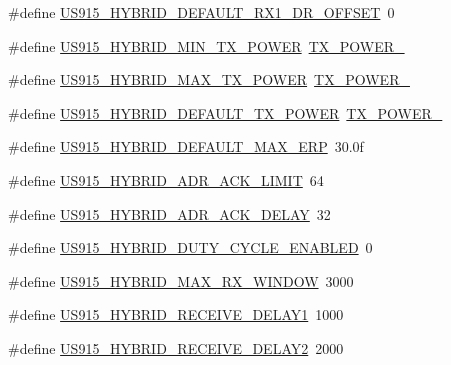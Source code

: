 \begin{DoxyCompactItemize}
\item 
\#define \hyperlink{group__REGIONUS915HYB_ga314e35b76742b3b9ba602e5e2bbcba3f}{U\+S915\+\_\+\+H\+Y\+B\+R\+I\+D\+\_\+\+D\+E\+F\+A\+U\+L\+T\+\_\+\+R\+X1\+\_\+\+D\+R\+\_\+\+O\+F\+F\+S\+ET}~0
\item 
\#define \hyperlink{group__REGIONUS915HYB_ga0aece8c836bf5bf19a28589cb3cda70e}{U\+S915\+\_\+\+H\+Y\+B\+R\+I\+D\+\_\+\+M\+I\+N\+\_\+\+T\+X\+\_\+\+P\+O\+W\+ER}~\hyperlink{group__REGION_gac9747c69350f34d485c3134e5a57655b}{T\+X\+\_\+\+P\+O\+W\+E\+R\+\_}
\item 
\#define \hyperlink{group__REGIONUS915HYB_ga94a1ed1e5cca1f05f0ac4916e164f529}{U\+S915\+\_\+\+H\+Y\+B\+R\+I\+D\+\_\+\+M\+A\+X\+\_\+\+T\+X\+\_\+\+P\+O\+W\+ER}~\hyperlink{group__REGION_gab33618449f2a573142c463ab071ef8ed}{T\+X\+\_\+\+P\+O\+W\+E\+R\+\_}
\item 
\#define \hyperlink{group__REGIONUS915HYB_gac33efe45e6e9b5ac53a97b4ed314c28e}{U\+S915\+\_\+\+H\+Y\+B\+R\+I\+D\+\_\+\+D\+E\+F\+A\+U\+L\+T\+\_\+\+T\+X\+\_\+\+P\+O\+W\+ER}~\hyperlink{group__REGION_gab33618449f2a573142c463ab071ef8ed}{T\+X\+\_\+\+P\+O\+W\+E\+R\+\_}
\item 
\#define \hyperlink{group__REGIONUS915HYB_gac045f9e8230d0740b4676fbade801432}{U\+S915\+\_\+\+H\+Y\+B\+R\+I\+D\+\_\+\+D\+E\+F\+A\+U\+L\+T\+\_\+\+M\+A\+X\+\_\+\+E\+RP}~30.\+0f
\item 
\#define \hyperlink{group__REGIONUS915HYB_ga1a479117e6e72786f00838f96288ecfd}{U\+S915\+\_\+\+H\+Y\+B\+R\+I\+D\+\_\+\+A\+D\+R\+\_\+\+A\+C\+K\+\_\+\+L\+I\+M\+IT}~64
\item 
\#define \hyperlink{group__REGIONUS915HYB_gad0a445c397f7510c7ebdca13b5197389}{U\+S915\+\_\+\+H\+Y\+B\+R\+I\+D\+\_\+\+A\+D\+R\+\_\+\+A\+C\+K\+\_\+\+D\+E\+L\+AY}~32
\item 
\#define \hyperlink{group__REGIONUS915HYB_ga7d99e44bc983c9f9e453640cc13712bf}{U\+S915\+\_\+\+H\+Y\+B\+R\+I\+D\+\_\+\+D\+U\+T\+Y\+\_\+\+C\+Y\+C\+L\+E\+\_\+\+E\+N\+A\+B\+L\+ED}~0
\item 
\#define \hyperlink{group__REGIONUS915HYB_ga1420db342d8dc812b2d4f033df8d2a9c}{U\+S915\+\_\+\+H\+Y\+B\+R\+I\+D\+\_\+\+M\+A\+X\+\_\+\+R\+X\+\_\+\+W\+I\+N\+D\+OW}~3000
\item 
\#define \hyperlink{group__REGIONUS915HYB_ga7f976c7a9c51b01109f0b18c9c9d14a7}{U\+S915\+\_\+\+H\+Y\+B\+R\+I\+D\+\_\+\+R\+E\+C\+E\+I\+V\+E\+\_\+\+D\+E\+L\+A\+Y1}~1000
\item 
\#define \hyperlink{group__REGIONUS915HYB_ga253fc685fda5fcc97f80f92be8d5fcf2}{U\+S915\+\_\+\+H\+Y\+B\+R\+I\+D\+\_\+\+R\+E\+C\+E\+I\+V\+E\+\_\+\+D\+E\+L\+A\+Y2}~2000

\end{DoxyCompactItemize}
